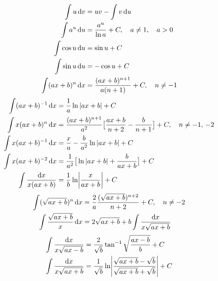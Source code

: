 


\begin{align}  
\int u\dif{v}&=uv -\int v\dif{u}\\
\int a^{u}\dif{u}&=\frac{a^{u}}{\ln {a}}+C, \quad a\ne 1,\quad a>0\\
 \int \cos u \dif{u}&=\sin u+C \\
 \int \sin u\dif{u}&=-\cos{u}+C\\
\int (ax+b)^{n} \dif {x}&=\frac{(ax+b)^{n+1}}{a(n+1)}+C, \quad n\ne -1\label{مساوات_جدول_تکمل_پانچ}
\end{align}
\begin{align}
  \int (ax+b)^{-1}\dif{x}&=\frac{1}{a}\ln |ax+b|+C    \\
 \int x(ax+b)^{n}\dif{x}&=\frac{(ax+b)^{n+1}}{a^{2}}\big[ \frac{ax+b}{n+2}-\frac{b}{n+1}\big]+C,\quad n\ne-1,\, -2        \label{مساوات_جدول_تکمل_سات} \\
 \int x(ax+b)^{-1} \dif{x}&=\frac{x}{a}-\frac{b}{a^{2}}\ln |ax+b|+C    \label{مساوات_جدول_تکمل_آٹھ}\\
  \int x(ax+b)^{-2}\dif{x}&=\frac{1}{a^{2}} \big[\ln|ax+b|+\frac{b}{ax+b} \big] +C      \\
 \int \frac{\dif{x}}{x(ax+b)}&=\frac{1}{b}\ln \abs{\frac{x}{ax+b}}+C        
 \end{align}
\begin{align} 
\int (\sqrt{ax+b})^{n}\dif{x}&=\frac{2}{a}\frac{(\sqrt{ax+b})^{n+2}}{n+2}+C,\quad n\ne-2\label{مساوات_جدول_تکمل_گیارہ}\\
\int \frac{\sqrt{ax+b}}{x}\dif{x}&=2\sqrt{ax+b}+b\int\frac{\dif{x}}{x\sqrt {ax+b}}
\end{align}
\begin{gather}
\begin{aligned}
\int \frac{\dif{x}}{x\sqrt{ax-b}}&=\frac{2}{\sqrt{b}}\tan^{-1}\sqrt{\frac{ax-b}{b}}+C\label{مساوات_جدول_تکمل_تیرہ}\\
\int \frac{\dif{x}}{x\sqrt{ax+b}}&=\frac{1}{\sqrt{b}}\ln\abs{\frac{\sqrt{ax+b}-\sqrt{b}}{\sqrt{ax+b}+\sqrt{b}}}+C
\end{aligned}
\end{gather}

